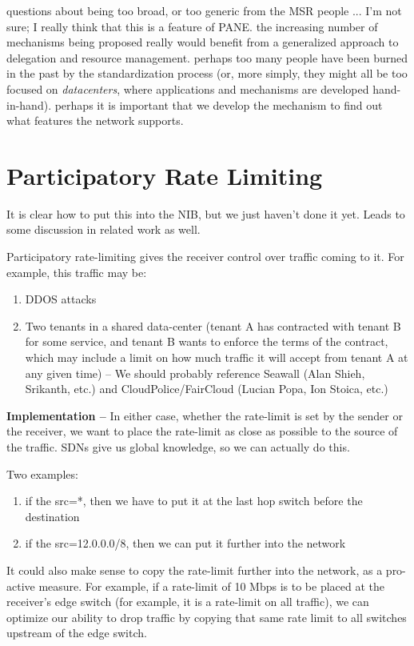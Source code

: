 questions about being too broad, or too generic from the MSR people  ... I'm not sure; I really think that this is a feature of PANE. the increasing number of mechanisms being proposed really would benefit from a generalized approach to delegation and resource management. perhaps too many people have been burned in the past by the standardization process (or, more simply, they might all be too focused on \emph{datacenters}, where applications and mechanisms are developed hand-in-hand). perhaps it is important that we develop the mechanism to find out what features the network supports.

\chapter{Participatory Rate Limiting}

{\color{red} It is clear how to put this into the NIB, but we just haven't done it yet. Leads to some
discussion in related work as well.}

Participatory rate-limiting gives the receiver control over traffic coming to 
it. For example, this traffic may be:
\begin{enumerate}
\item DDOS attacks
\item Two tenants in a shared data-center (tenant A has contracted with tenant 
B for some service, and tenant B wants to enforce the terms of the contract, 
which may include a limit on how much traffic it will accept from tenant A at 
any given time) -- We should probably reference Seawall (Alan Shieh, Srikanth, 
etc.) and CloudPolice/FairCloud (Lucian Popa, Ion Stoica, etc.)
\end{enumerate}

{\bf Implementation -- }  In either case, whether the rate-limit is set by the 
sender or the receiver, we want to place the rate-limit as close as possible to 
the source of the traffic.  SDNs give us global knowledge, so we can actually 
do this.

Two examples:
\begin{enumerate}
\item if the src=*, then we have to put it at the last hop switch before the 
destination
\item if the src=12.0.0.0/8, then we can put it further into the network
\end{enumerate}

It could also make sense to copy the rate-limit further into the network, as a 
pro-active measure. For example, if a rate-limit of 10 Mbps is to be placed at 
the receiver's edge switch (for example, it is a rate-limit on all traffic), we 
can optimize our ability to drop traffic by copying that same rate limit to all 
switches upstream of the edge switch. 

